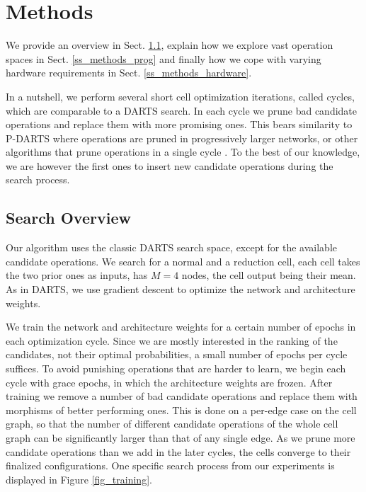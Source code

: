 \documentclass[conference]{IEEEtran}
\begin{document}
\section{Methods}
\label{s_methods}

We provide an overview in Sect. \ref{ss_methods_searchspace}, explain how we explore vast operation spaces in Sect. \ref{ss_methods_prog} and finally how we cope with varying hardware requirements in Sect. \ref{ss_methods_hardware}.

In a nutshell, we perform several short cell optimization iterations, called cycles, which are comparable to a DARTS search. In each cycle we prune bad candidate operations and replace them with more promising ones. This bears similarity to P-DARTS \cite{nas_pdarts} where operations are pruned in progressively larger networks, or other algorithms that prune operations in a single cycle \cite{nas_asap}. To the best of our knowledge, we are however the first ones to insert new candidate operations during the search process.








\subsection{Search Overview}
\label{ss_methods_searchspace}

Our algorithm uses the classic DARTS search space, except for the available candidate operations.
We search for a normal and a reduction cell, each cell takes the two prior ones as inputs, has $M=4$ nodes, the cell output being their mean.
As in DARTS, we use gradient descent to optimize the network and architecture weights.

We train the network and architecture weights for a certain number of epochs in each optimization cycle. Since we are mostly interested in the ranking of the candidates, not their optimal probabilities, a small number of epochs per cycle suffices.
To avoid punishing operations that are harder to learn, we begin each cycle with grace epochs, in which the architecture weights are frozen. After training we remove a number of bad candidate operations and replace them with morphisms of better performing ones. This is done on a per-edge case on the cell graph, so that the number of different candidate operations of the whole cell graph can be significantly larger than that of any single edge.
As we prune more candidate operations than we add in the later cycles, the cells converge to their finalized configurations. One specific search process from our experiments is displayed in Figure \ref{fig_training}.
\end{document}
